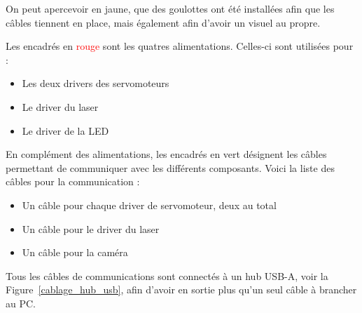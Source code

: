 On peut apercevoir en \textcolor[RGB]{230, 230, 0}{jaune}, que des goulottes ont été installées afin que les câbles tiennent en place, mais également afin d'avoir un visuel au propre.

Les encadrés en \textcolor{red}{rouge} sont les quatres alimentations. Celles-ci sont utilisées pour :
\begin{itemize}[label=\textbullet]
    \item Les deux drivers des servomoteurs
    \item Le driver du laser
    \item Le driver de la LED
\end{itemize}
\vspace{0.5em}
En complément des alimentations, les encadrés en \textcolor[RGB]{0, 201, 18}{vert} désignent les câbles permettant de communiquer avec les différents composants. Voici la liste des câbles pour la communication :
\begin{itemize}[label=\textbullet]
    \item Un câble pour chaque driver de servomoteur, deux au total
    \item Un câble pour le driver du laser
    \item Un câble pour la caméra
\end{itemize}
\vspace{0.5em}
Tous les câbles de communications sont connectés à un hub USB-A, voir la Figure~\ref{cablage_hub_usb}, afin d'avoir en sortie plus qu'un seul câble à brancher au PC.